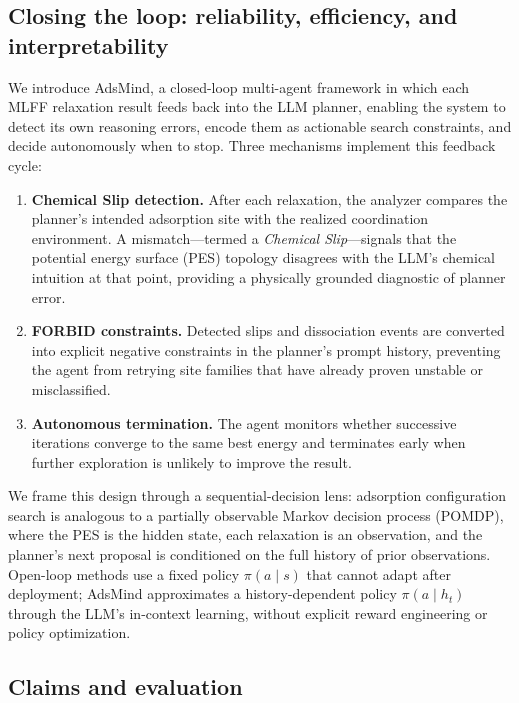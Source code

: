 \subsection{Closing the loop: reliability, efficiency, and interpretability}

We introduce AdsMind, a closed-loop multi-agent framework in which each MLFF relaxation result feeds back into the LLM planner, enabling the system to detect its own reasoning errors, encode them as actionable search constraints, and decide autonomously when to stop.
Three mechanisms implement this feedback cycle:

\begin{enumerate}
    \item \textbf{Chemical Slip detection.} After each relaxation, the analyzer compares the planner's intended adsorption site with the realized coordination environment. A mismatch---termed a \textit{Chemical Slip}---signals that the potential energy surface (PES) topology disagrees with the LLM's chemical intuition at that point, providing a physically grounded diagnostic of planner error.
    \item \textbf{FORBID constraints.} Detected slips and dissociation events are converted into explicit negative constraints in the planner's prompt history, preventing the agent from retrying site families that have already proven unstable or misclassified.
    \item \textbf{Autonomous termination.} The agent monitors whether successive iterations converge to the same best energy and terminates early when further exploration is unlikely to improve the result.
\end{enumerate}

We frame this design through a sequential-decision lens: adsorption configuration search is analogous to a partially observable Markov decision process (POMDP), where the PES is the hidden state, each relaxation is an observation, and the planner's next proposal is conditioned on the full history of prior observations.
Open-loop methods use a fixed policy $\pi(a \mid s)$ that cannot adapt after deployment; AdsMind approximates a history-dependent policy $\pi(a \mid h_t)$ through the LLM's in-context learning, without explicit reward engineering or policy optimization.

\subsection{Claims and evaluation}

